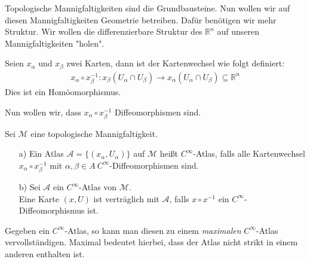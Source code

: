 Topologische Mannigfaltigkeiten sind die Grundbausteine. Nun wollen wir auf diesen Mannigfaltigkeiten Geometrie betreiben. Dafür benötigen wir mehr Struktur. Wir wollen die differenzierbare Struktur des $\mathbb{R}^n$ auf unseren Mannigfaltigkeiten "holen".

\begin{defs}[Kartenwechsel]
Seien $x_{\alpha}$ und $x_{\beta}$ zwei Karten, dann ist der Kartenwechsel wie folgt definiert: \\
\begin{align}
x_{\alpha}\circ x_{\beta}^{-1}: x_{\beta}(U_{\alpha}\cap U_{\beta}) \rightarrow x_{\alpha}(U_{\alpha}\cap U_{\beta}) \subseteq \mathbb{R}^n
\end{align}
Dies ist ein Homöomorphismus.
\end{defs}
Nun wollen wir, dass $x_{\alpha}\circ x_{\beta}^{-1}$ Diffeomorphismen sind.

\begin{defs}
Sei $ \mathcal{M}$ eine topologische Mannigfaltigkeit.
\begin{enumerate}
	\item[a)] Ein Atlas $\mathcal{A} = \{(x_{\alpha},U_{\alpha})\}$ auf $\mathcal{M}$ heißt $C^{\infty}$-Atlas, falls alle Kartenwechsel $x_{\alpha}\circ x_{\beta}^{-1}$ mit $\alpha, \beta \in A \ C^{\infty}$-Diffeomorphismen sind.
	\item[b)] Sei $\mathcal{A}$ ein $C^{\infty}$-Atlas von $\mathcal{M}$. \\
	Eine Karte $(x,U)$ ist verträglich mit $\mathcal{A}$, falls $x \circ x^{-1}$ ein $C^{\infty}$-Diffeomorphismus ist.
\end{enumerate}
\end{defs}
Gegeben ein $C^{\infty}$-Atlas, so kann man diesen zu einem \textit{maximalen} $C^{\infty}$-Atlas vervollständigen. Maximal bedeutet hierbei, dass der Atlas nicht strikt in einem anderen enthalten ist.

